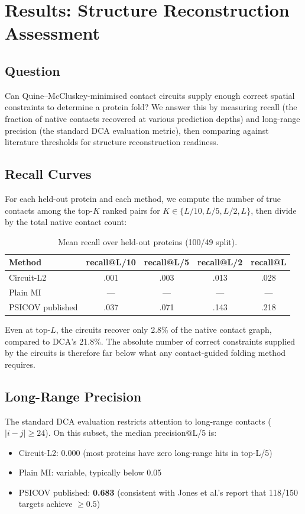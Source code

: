 \section{Results: Structure Reconstruction Assessment}
\label{sec:results-reconstruction}

\subsection{Question}
Can Quine--McCluskey-minimised contact circuits supply enough correct spatial
constraints to determine a protein fold?  We answer this by measuring recall
(the fraction of native contacts recovered at various prediction depths) and
long-range precision (the standard DCA evaluation metric), then comparing
against literature thresholds for structure reconstruction readiness.

\subsection{Recall Curves}
For each held-out protein and each method, we compute the number of true
contacts among the top-$K$ ranked pairs for $K \in \{L/10, L/5, L/2, L\}$,
then divide by the total native contact count:

\begin{table}[ht]
	\centering
	\caption{Mean recall over held-out proteins (100/49 split).}
	\label{tab:recall}
	\begin{tabular}{lcccc}
		\toprule
		Method           & recall@L/10 & recall@L/5 & recall@L/2 & recall@L \\
		\midrule
		Circuit-L2       & .001        & .003       & .013       & .028     \\
		Plain MI         & ---         & ---        & ---        & ---      \\
		PSICOV published & .037        & .071       & .143       & .218     \\
		\bottomrule
	\end{tabular}
\end{table}

Even at top-$L$, the circuits recover only 2.8\% of the native contact graph,
compared to DCA's 21.8\%.  The absolute number of correct constraints supplied
by the circuits is therefore far below what any contact-guided folding method
requires.

\subsection{Long-Range Precision}
The standard DCA evaluation restricts attention to long-range contacts
($|i - j| \geq 24$).  On this subset, the median precision@L/5 is:
\begin{itemize}[nosep]
	\item Circuit-L2: 0.000 (most proteins have zero long-range hits in top-L/5)
	\item Plain MI: variable, typically below 0.05
	\item PSICOV published: \textbf{0.683} (consistent with Jones et al.'s report
	      that 118/150 targets achieve $\geq 0.5$)
\end{itemize}

